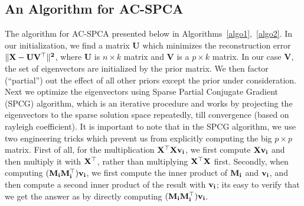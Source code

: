 \documentclass{article}
\begin{document}



\subsection{An Algorithm for AC-SPCA}
The algorithm for AC-SPCA presented below in Algorithms~\ref{algo1},~\ref{algo2}. In our initialization, we find a matrix {\bf U} which minimizes the reconstruction error  $\bf \|X - UV^{\top}\|^2$, where {\bf U} is $n\times k$ matrix and {\bf V} is a {$p \times k$} matrix. In our case {\bf V}, the set of eigenvectors are initialized by the prior matrix. We then factor (``partial'') out the effect of all other priors except the prior under consideration. Next we optimize the eigenvectors using Sparse Partial Conjugate Gradient (SPCG) algorithm, which is an iterative procedure and works by projecting the eigenvectors to the sparse solution space repeatedly, till convergence (based on rayleigh coefficient). It is important to note that in the SPCG algorithm, we use two engineering tricks which prevent us from explicitly computing the big $p\times p$ matrix.  First of all, for the multiplication $\bf X^{\top}Xv_i$, we first compute $\bf Xv_i$ and then multiply it with $\bf X^{\top}$, rather than multiplying $\bf X^{\top}X$ first. Secondly, when computing $({\bf M_iM_i^{\top}}){\bf v_i}$, we first compute the inner product of ${\bf M_i}$ and $\bf v_i$, and then compute a second inner product of the result with  $\bf v_i$; its easy to verify that we get the answer as by directly computing $({\bf M_iM_i^{\top}}){\bf v_i}$.
\end{document}
